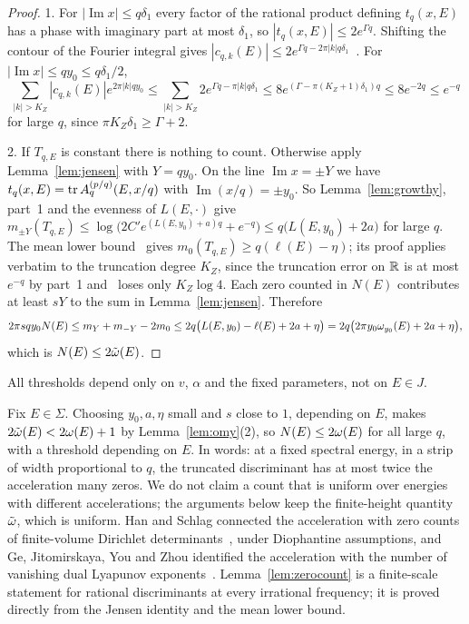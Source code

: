 \begin{proof}
1. For $|\operatorname{Im}x|\le q\delta_1$ every factor of the rational product defining $t_q(x,E)$ has a phase with imaginary part at most $\delta_1$, so $|t_q(x,E)|\le2e^{\Gamma q}$. Shifting the contour of the Fourier integral gives $|c_{q,k}(E)|\le2e^{\Gamma q-2\pi|k|q\delta_1}$~\cite[proof of Lemma~7.5]{DMuniv}. For $|\operatorname{Im}x|\le qy_0\le q\delta_1/2$,
\[
\sum_{|k|>K_Z}|c_{q,k}(E)|e^{2\pi|k|qy_0}\le\sum_{|k|>K_Z}2e^{\Gamma q-\pi|k|q\delta_1}\le8e^{(\Gamma-\pi(K_Z+1)\delta_1)q}\le8e^{-2q}\le e^{-q}
\]
for large $q$, since $\pi K_Z\delta_1\ge\Gamma+2$.

2. If $T_{q,E}$ is constant there is nothing to count. Otherwise apply Lemma~\ref{lem:jensen} with $Y=qy_0$. On the line $\operatorname{Im}x=\pm Y$ we have $t_q(x,E)=\operatorname{tr} A^{(p/q)}_q(E,x/q)$ with $\operatorname{Im}(x/q)=\pm y_0$. So Lemma~\ref{lem:growthy}, part~1 and the evenness of $L(E,\cdot)$ give $m_{\pm Y}(T_{q,E})\le\log\bigl(2C'e^{(L(E,y_0)+a)q}+e^{-q}\bigr)\le q\bigl(L(E,y_0)+2a\bigr)$ for large $q$. The mean lower bound~\cite[Lemma~7.6]{DMuniv} gives $m_0(T_{q,E})\ge q(\ell(E)-\eta)$; its proof applies verbatim to the truncation degree $K_Z$, since the truncation error on $\mathbb R$ is at most $e^{-q}$ by part~1 and~\cite[Lemma~7.3(5)]{DMuniv} loses only $K_Z\log4$. Each zero counted in $N(E)$ contributes at least $sY$ to the sum in Lemma~\ref{lem:jensen}. Therefore
\[
2\pi sqy_0N(E)\le m_Y+m_{-Y}-2m_0\le2q\bigl(L(E,y_0)-\ell(E)+2a+\eta\bigr)=2q\bigl(2\pi y_0\omega_{y_0}(E)+2a+\eta\bigr),
\]
which is $N(E)\le2\tilde\omega(E)$.
\end{proof}

All thresholds depend only on $v$, $\alpha$ and the fixed parameters, not on $E\in J$.

\begin{remark}\label{rem:twice}
Fix $E\in\Sigma$. Choosing $y_0,a,\eta$ small and $s$ close to $1$, depending on $E$, makes $2\tilde\omega(E)<2\omega(E)+1$ by Lemma~\ref{lem:omy}(2), so $N(E)\le2\omega(E)$ for all large $q$, with a threshold depending on $E$. In words: at a fixed spectral energy, in a strip of width proportional to $q$, the truncated discriminant has at most twice the acceleration many zeros. We do not claim a count that is uniform over energies with different accelerations; the arguments below keep the finite-height quantity $\tilde\omega$, which is uniform. Han and Schlag connected the acceleration with zero counts of finite-volume Dirichlet determinants~\cite[Theorem~1.2]{HanSchlag2022}, under Diophantine assumptions, and Ge, Jitomirskaya, You and Zhou identified the acceleration with the number of vanishing dual Lyapunov exponents~\cite{GJYZ2023}. Lemma~\ref{lem:zerocount} is a finite-scale statement for rational discriminants at every irrational frequency; it is proved directly from the Jensen identity and the mean lower bound.
\end{remark}

